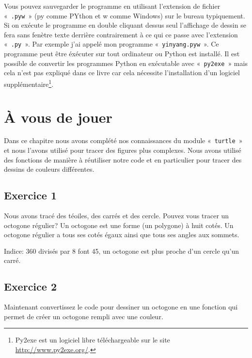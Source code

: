 Vous pouvez sauvegarder le programme en utilisant l'extension de fichier «~\texttt{.pyw}~» (py comme PYthon et w comme Windows) sur le bureau typiquement. Si on exécute le programme en double cliquant dessus seul l'affichage de dessin se fera sans fenètre texte derrière contrairement à ce qui ce passe avec l'extension «~\texttt{.py}~». Par exemple j'ai appelé mon programme «~\texttt{yinyang.pyw}~». Ce programme peut être éxécuter sur tout ordinateur ou Python est installé. Il est possible de convertir les programmes Python en exécutable avec «~\texttt{py2exe}~» mais cela n'est pas expliqué dans ce livre car cela nécessite l'installation d'un logiciel supplémentaire\footnote{Py2exe est un logiciel libre téléchargeable sur le site \url{http://www.py2exe.org/}.}.


\section{À vous de jouer}

Dans ce chapitre nous avons complété nos connaissances du module «~\texttt{turtle}~» et nous l'avons utilisé pour tracer des figures plus complexes. Nous avons utilisé des fonctions de manière à réutiliser notre code et en particulier pour tracer des dessins de couleurs différentes.

\subsection{Exercice 1}
Nous avons tracé des téoiles, des carrés et des cercle. Pouvez vous tracer un octogone régulier? Un octogone est une forme (un polygone) à huit cotés. Un octogone régulier a tous ses cotés égaux ainsi que tous ses angles aux sommets.

Indice: 360 divisés par 8 font 45, un octogone est plus proche d'un cercle qu'un carré.

\subsection{Exercice 2}
Maintenant convertissez le code pour dessiner un octogone en une fonction qui permet de créer un octogone rempli avec une couleur.

